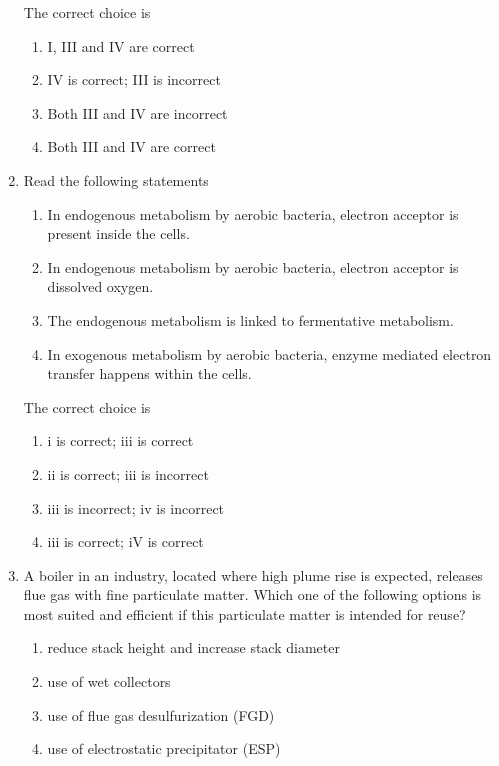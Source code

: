 \documentclass[journal,12pt,onecolumn]{IEEEtran}
\theoremstyle{remark}
\begin{document}
\begin{enumerate}
The correct choice is
\begin{enumerate}
\item I, III and IV are correct
\item IV is correct; III is incorrect
\item Both III and IV are incorrect
\item Both III and IV are correct
\end{enumerate}
\hfill{}
\item Read the following statements
\begin{enumerate}[label=\roman*)]
\item In endogenous metabolism by aerobic bacteria, electron acceptor is present inside the cells.
\item In endogenous metabolism by aerobic bacteria, electron acceptor is dissolved oxygen.
\item The endogenous metabolism is linked to fermentative metabolism.
\item In exogenous metabolism by aerobic bacteria, enzyme mediated electron transfer happens within the cells.
\end{enumerate}

The correct choice is
\begin{enumerate}
\item i is correct; iii is correct
\item ii is correct; iii is incorrect
\item iii is incorrect; iv is incorrect
\item iii is correct; iV is correct
\end{enumerate}
\hfill{}

\item A boiler in an industry, located where high plume rise is expected, releases flue gas with fine particulate matter. Which one of the following options is most suited and efficient if this particulate matter is intended for reuse?
\begin{enumerate}
\item reduce stack height and increase stack diameter
\item use of wet collectors
\item use of flue gas desulfurization (FGD)
\item use of electrostatic precipitator (ESP)
\end{enumerate}
\hfill{}

\newpage


\end{enumerate}
\end{document}
